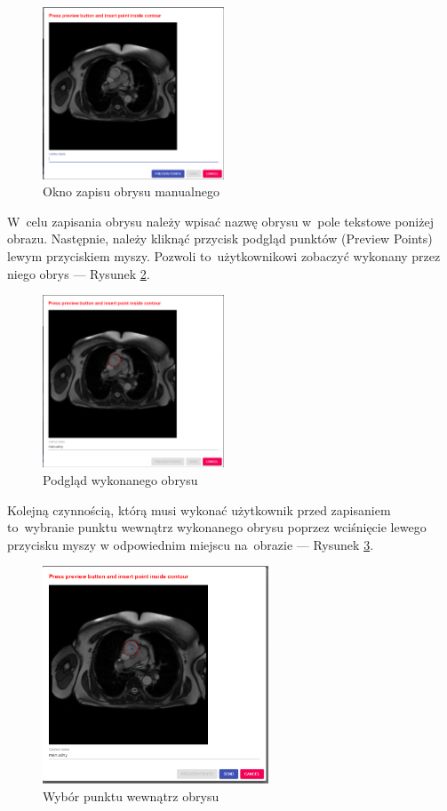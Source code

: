 \documentclass[a4paper,11pt,twoside,openright]{report}
\theoremstyle{definition}
\begin{document}
\begin{figure}[h!]
	\center
	\includegraphics[width=0.48\textwidth]{6}
	\caption{Okno zapisu obrysu manualnego}
    	\label{fig:6}
\end{figure}

W~celu zapisania obrysu należy wpisać nazwę obrysu w~pole tekstowe poniżej obrazu.
Następnie, należy kliknąć przycisk podgląd punktów (Preview Points)
lewym przyciskiem myszy. Pozwoli to~użytkownikowi zobaczyć wykonany przez niego
obrys --- Rysunek \ref{fig:7}.

\begin{figure}[h!]
	\center
	\includegraphics[width=0.48\textwidth]{7}
	\caption{Podgląd wykonanego obrysu}
    	\label{fig:7}
\end{figure}

Kolejną czynnością, którą musi wykonać użytkownik przed zapisaniem to~wybranie
punktu wewnątrz wykonanego obrysu poprzez wciśnięcie lewego przycisku myszy w
odpowiednim miejscu na~obrazie --- Rysunek \ref{fig:8}.

\pagebreak

\begin{figure}[h!]
	\center
	\includegraphics[width=0.6\textwidth]{8}
	\caption{Wybór punktu wewnątrz obrysu}
    	\label{fig:8}
\end{figure}
\end{document}
